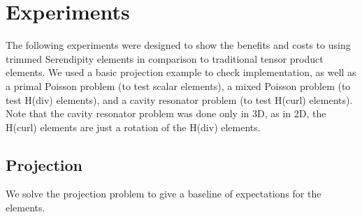 \documentclass[manuscript,screen]{acmart}
\begin{document}
  \section{Experiments}
    
   The following experiments were designed to show the benefits and costs to using trimmed Serendipity elements in comparison to traditional tensor product elements.  We used a basic projection example to check implementation, as well as a primal Poisson problem (to test scalar elements), a mixed Poisson problem (to test H(div) elements), and a cavity resonator problem (to test H(curl) elements).  Note that the cavity resonator problem was done only in 3D, as in 2D, the H(curl) elements are just a rotation of the H(div) elements. 

\newpage
  \subsection{Projection}
  
  We solve the projection problem to give a baseline of expectations for the elements.  
\end{document}
